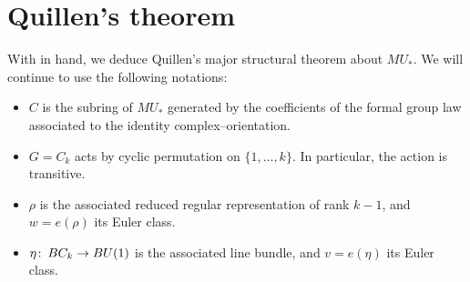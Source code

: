 









\section{Quillen's theorem}

With  in hand, we deduce Quillen's major structural theorem about $MU_*$.  We will continue to use the following notations:
\begin{itemize}
\item $C$ is the subring of $MU_*$ generated by the coefficients of the formal group law associated to the identity complex--orientation.
\item $G = C_k$ acts by cyclic permutation on $\{1, \ldots, k\}$.  In particular, the action is transitive.
\item $\rho$ is the associated reduced regular representation of rank $k-1$, and $w = e(\rho)$ its Euler class.
\item $\eta\colon\thinspace BC_k \to BU(1)$ is the associated line bundle, and $v = e(\eta)$ its Euler class.
\end{itemize}

